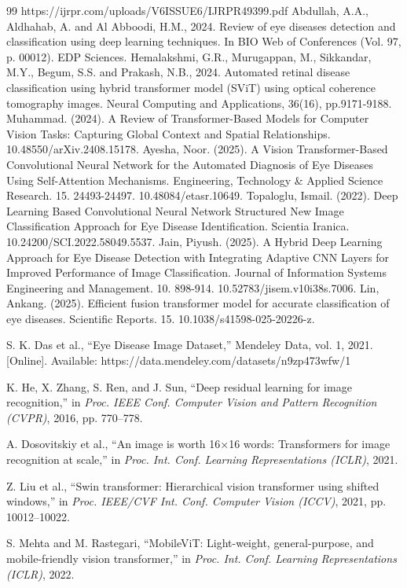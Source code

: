\documentclass[conference,9pt]{IEEEtran}
\begin{document}
\begin{thebibliography}{99}
https://ijrpr.com/uploads/V6ISSUE6/IJRPR49399.pdf
Abdullah, A.A., Aldhahab, A. and Al Abboodi, H.M., 2024. Review of eye diseases detection and classification using deep learning techniques. In BIO Web of Conferences (Vol. 97, p. 00012). EDP Sciences. 
Hemalakshmi, G.R., Murugappan, M., Sikkandar, M.Y., Begum, S.S. and Prakash, N.B., 2024. Automated retinal disease classification using hybrid transformer model (SViT) using optical coherence tomography images. Neural Computing and Applications, 36(16), pp.9171-9188.
Muhammad. (2024). A Review of Transformer-Based Models for Computer Vision Tasks: Capturing Global Context and Spatial Relationships. 10.48550/arXiv.2408.15178.
Ayesha, Noor. (2025). A Vision Transformer-Based Convolutional Neural Network for the Automated Diagnosis of Eye Diseases Using Self-Attention Mechanisms. Engineering, Technology \& Applied Science Research. 15. 24493-24497. 10.48084/etasr.10649.
Topaloglu, Ismail. (2022). Deep Learning Based Convolutional Neural Network Structured New Image Classification Approach for Eye Disease Identification. Scientia Iranica. 10.24200/SCI.2022.58049.5537.
Jain, Piyush. (2025). A Hybrid Deep Learning Approach for Eye Disease Detection with Integrating Adaptive CNN Layers for Improved Performance of Image Classification. Journal of Information Systems Engineering and Management. 10. 898-914. 10.52783/jisem.v10i38s.7006.
Lin, Ankang. (2025). Efficient fusion transformer model for accurate classification of eye diseases. Scientific Reports. 15. 10.1038/s41598-025-20226-z.

S. K. Das et al., “Eye Disease Image Dataset,” Mendeley Data, vol. 1, 2021. [Online]. Available: https://data.mendeley.com/datasets/n9zp473wfw/1

K. He, X. Zhang, S. Ren, and J. Sun, “Deep residual learning for image recognition,” in \emph{Proc. IEEE Conf. Computer Vision and Pattern Recognition (CVPR)}, 2016, pp. 770–778.

A. Dosovitskiy et al., “An image is worth 16×16 words: Transformers for image recognition at scale,” in \emph{Proc. Int. Conf. Learning Representations (ICLR)}, 2021.

Z. Liu et al., “Swin transformer: Hierarchical vision transformer using shifted windows,” in \emph{Proc. IEEE/CVF Int. Conf. Computer Vision (ICCV)}, 2021, pp. 10012–10022.

S. Mehta and M. Rastegari, “MobileViT: Light-weight, general-purpose, and mobile-friendly vision transformer,” in \emph{Proc. Int. Conf. Learning Representations (ICLR)}, 2022.


\end{thebibliography}
\end{document}
